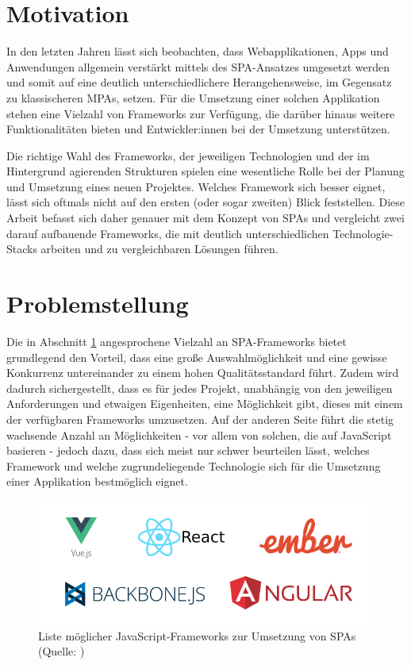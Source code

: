 \documentclass[a4paper,12pt,twoside]{scrreprt}
\begin{document}
\section{Motivation}
\label{sec:motivation}
In den letzten Jahren lässt sich beobachten, dass Webapplikationen, Apps und Anwendungen allgemein verstärkt mittels des \ac{SPA}-Ansatzes umgesetzt werden und somit auf eine deutlich unterschiedlichere Herangehensweise, im Gegensatz zu klassischeren \acp{MPA}, setzen. \parencite[][]{ismail_why_2019} Für die Umsetzung einer solchen Applikation stehen eine Vielzahl von Frameworks zur Verfügung, die darüber hinaus weitere Funktionalitäten bieten und Entwickler:innen bei der Umsetzung unterstützen.

\newpage

Die richtige Wahl des Frameworks, der jeweiligen Technologien und der im Hintergrund agierenden Strukturen spielen eine wesentliche Rolle bei der Planung und Umsetzung eines neuen Projektes. Welches Framework sich besser eignet, lässt sich oftmals nicht auf den ersten (oder sogar zweiten) Blick feststellen. Diese Arbeit befasst sich daher genauer mit dem Konzept von \acp{SPA} und vergleicht zwei darauf aufbauende Frameworks, die mit deutlich unterschiedlichen Technologie-Stacks arbeiten und zu vergleichbaren Lösungen führen.

\section{Problemstellung}
\label{sec:problemstellung}
Die in Abschnitt \ref{sec:motivation} angesprochene Vielzahl an \ac{SPA}-Frameworks bietet grundlegend den Vorteil, dass eine große Auswahlmöglichkeit und eine gewisse Konkurrenz untereinander zu einem hohen Qualitätsstandard führt. Zudem wird dadurch sichergestellt, dass es für jedes Projekt, unabhängig von den jeweiligen Anforderungen und etwaigen Eigenheiten, eine Möglichkeit gibt, dieses mit einem der verfügbaren Frameworks umzusetzen. Auf der anderen Seite führt die stetig wachsende Anzahl an Möglichkeiten - vor allem von solchen, die auf JavaScript basieren - jedoch dazu, dass sich meist nur schwer beurteilen lässt, welches Framework und welche zugrundeliegende Technologie sich für die Umsetzung einer Applikation bestmöglich eignet.

\begin{figure}[ht]
    \centering
    \includegraphics[scale=0.5]{images/A_JS-frameworks.png}
    \caption[Liste möglicher JavaScript-Frameworks zur Umsetzung von \acsp{SPA}]{Liste möglicher JavaScript-Frameworks zur Umsetzung von \acsp{SPA} (Quelle: \cite[][]{a_best_2020})}
    \label{fig:js-frameworks}
\end{figure}
\end{document}
